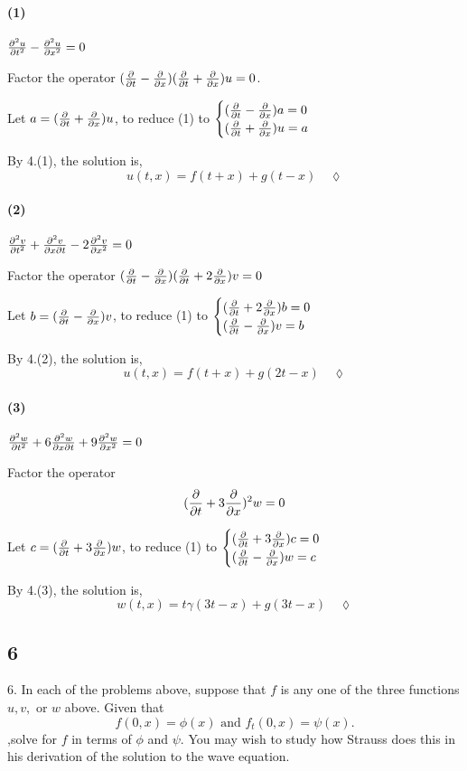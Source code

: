 \documentclass{article}
\begin{document}
\paragraph{(1)} $\pdv[2]{u}{t}-\pdv[2]{u}{x} = 0$


Factor the operator $(\pdv{t}-\pdv{x})(\pdv{t}+\pdv{x})u = 0$.

Let $a = (\pdv{t}+\pdv{x})u$, to reduce (1) to $\begin{cases}
  (\pdv{t}-\pdv{x})a = 0\\ (\pdv{t}+\pdv{x})u = a\end{cases}$

By 4.(1), the solution is,
\[u(t,x) = f(t+x)+g(t-x)\quad \lozenge\]

\paragraph{(2)} $\pdv[2]{v}{t} +\pdv{v}{x}{t} -2\pdv[2]{v}{x} = 0$


Factor the operator $(\pdv{t}-\pdv{x})(\pdv{t}+2\pdv{x})v =0$

Let $b = (\pdv{t}-\pdv{x})v$, to reduce (1) to $\begin{cases}
  (\pdv{t}+2\pdv{x})b = 0\\ (\pdv{t}-\pdv{x})v = b\end{cases}$

By 4.(2), the solution is,
\[u(t,x) = f(t+x)+g(2t-x)\quad \lozenge\]

\paragraph{(3)} $\pdv[2]{w}{t} +6\pdv{w}{x}{t} +9\pdv[2]{w}{x} = 0$


Factor the operator
\[(\pdv{t}+3\pdv{x})^2w =0\]

Let $c = (\pdv{t}+3\pdv{x})w$, to reduce (1) to $\begin{cases}
  (\pdv{t}+3\pdv{x})c = 0\\ (\pdv{t}-\pdv{x})w = c\end{cases}$

By 4.(3), the solution is,
\[w(t,x) = t\gamma(3t-x)+g(3t-x)\quad \lozenge\]

\subsection*{6} 6. In each of the problems above, suppose that $f$ is any one of the three functions
$u, v,$ or $w$ above. Given that
\[f(0,x) =\phi(x)\text{ and } f_t(0,x) = \psi(x).\]
,solve for $f$ in terms of $\phi$ and $\psi$. You may wish to study how Strauss does this in his derivation
of the solution to the wave equation.
\end{document}
